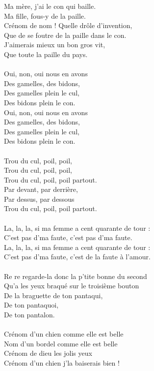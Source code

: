 \breakpage
Ma mère, j'ai le con qui baille.
\\Ma fille, fous-y de la paille.
\\Crénom de nom ! Quelle drôle d'invention,
\\Que de se foutre de la paille dans le con.
\\J'aimerais mieux un bon gros vit,
\\Que toute la paille du pays.
\\\\Oui, non, oui nous en avons
\\Des gamelles, des bidons,
\\Des gamelles plein le cul,
\\Des bidons plein le con.
\\Oui, non, oui nous en avons
\\Des gamelles, des bidons,
\\Des gamelles plein le cul,
\\Des bidons plein le con.
\\\\Trou du cul, poil, poil, 
\\Trou du cul, poil, poil,
\\Trou du cul, poil, poil partout.
\\Par devant, par derrière, 
\\Par dessus, par dessous
\\Trou du cul, poil, poil partout.
\\\\La, la, la, si ma femme a cent quarante de tour :
\\C'est pas d'ma faute, c'est pas d'ma faute.
\\La, la, la, si ma femme a cent quarante de tour :
\\C'est pas d'ma faute, c'est de la faute à l'amour.
\\\\Re re regarde-la donc la p'tite bonne du second
\\Qu'a les yeux braqué sur le troisième bouton
\\De la braguette de ton pantaqui,
\\De ton pantaquoi,
\\De ton pantalon.
\\\\Crénom d'un chien comme elle est belle 
\\Nom d'un bordel comme elle est belle
\\Crénom de dieu les jolis yeux 
\\Crénom d'un chien j'la baiserais bien !
